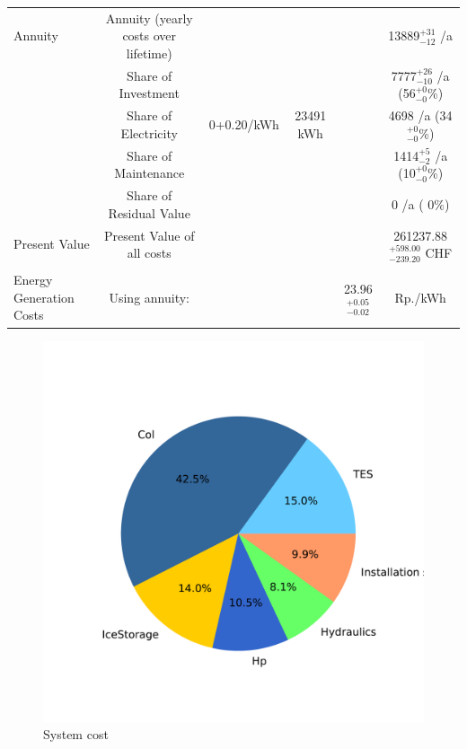 \documentclass[english]{SPFShortReport}
\begin{document}
\begin{table}[!ht]
\begin{adjustbox}{max width =\textwidth}
\begin{tabular}{l | c c c c c }
Annuity & Annuity (yearly costs over lifetime)  &&& & 13889$^{\mathrm{+31}}_{\mathrm{-12}}$ /a  \\
 & Share of Investment & &&& 7777$^{\mathrm{+26}}_{\mathrm{-10}}$ /a (56$^{\mathrm{+ 0}}_{\mathrm{- 0}}$\%) \\
 & Share of Electricity & 0+0.20/kWh & 23491 kWh &  & 4698 /a (34$^{\mathrm{+ 0}}_{\mathrm{- 0}}$\%)\\
 & Share of Maintenance & &&& 1414$^{\mathrm{+ 5}}_{\mathrm{- 2}}$ /a (10$^{\mathrm{+ 0}}_{\mathrm{- 0}}$\%)\\ 
 & Share of Residual Value &&& &  0 /a ( 0\%)\\
Present Value  & Present Value of all costs  & &&& 261237.88$^{\mathrm{+598.00}}_{\mathrm{-239.20}}$ CHF \\
\hline \\ 
 Energy Generation Costs & Using annuity: &&& 23.96$^{\mathrm{+0.05}}_{\mathrm{-0.02}}$ & Rp./kWh \\
\hline
\hline
\end{tabular}
\end{adjustbox}
\label{CostsTable}
\end{table}
\begin{figure}[!htbp]
\begin{center}
\includegraphics[width=1\textwidth]{costShare-HydD_mfb30_real_dryN-CityBAS_dryNAc1.0x58.086Vice0.4x58.086HP1.0x18.442-Year0.pdf}
\caption{System cost}
\label{systemCost}
\end{center}
\end{figure}
\end{document}
